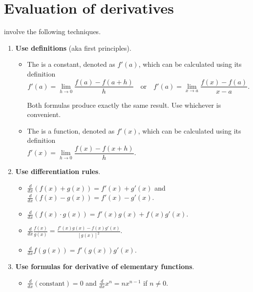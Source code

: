 \documentclass[../main.tex]{subfiles}
\begin{document}
 \section{Evaluation of derivatives}

 involve the following techniques.
\begin{enumerate}
  \item \textbf{Use definitions} (aka first principles). 
    \begin{itemize}
      \item The  is a constant, denoted as \(f'(a)\), which can be calculated using its definition
        \[
          f'(a) = \lim_{h \to 0} \frac{f(a) - f(a + h)}{h} 
          \quad\text{or}\quad
          f'(a) = \lim_{x \to a} \frac{f(x) - f(a)}{x - a}.
        \]

        Both formulas produce exactly the same result. Use whichever is convenient.

      \item The  is a function, denoted as \(f'(x)\), which can be calculated using its definition
        \[
          f'(x) = \lim_{h \to 0} \frac{f(x) - f(x + h)}{h}.
          \phantom{\quad\text{or}\quad
          f'(a) = \lim_{x \to a} \frac{f(x) - f(a)}{x - a}}
        \]
    \end{itemize}

  \item \textbf{Use differentiation rules}.
    \begin{itemize}
      \item \(\frac{d}{dx} \left( f(x) + g(x) \right) = f'(x) + g'(x)\) and \(\frac{d}{dx} \left( f(x) - g(x) \right) = f'(x) - g'(x)\).
      \item \(\frac{d}{dx} \left( f(x) \cdot g(x) \right) = f'(x)g(x) + f(x) g'(x)\).
      \item \(\frac{d}{dx} \frac{f(x)}{g(x)} = \frac{f'(x)g(x) - f(x) g'(x)}{\left[g(x)\right]^{2}}\).
      \item \(\frac{d}{dx} f(g(x)) = f'( g(x) ) g'(x)\).
    \end{itemize}

  \item \textbf{Use formulas for derivative of elementary functions}.
    \begin{itemize}
      \item \(\frac{d}{dx} (\text{constant}) = 0\) and \(\frac{d}{dx} x^{n} = n x^{n-1}\) if \(n \ne 0\).  


\end{itemize}
\end{enumerate}
\end{document}
